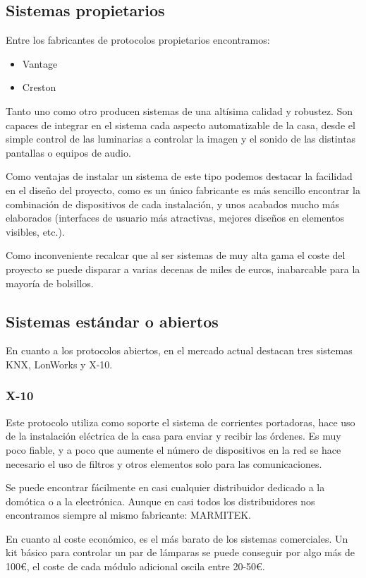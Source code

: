 \subsection{Sistemas propietarios}
Entre los fabricantes de protocolos propietarios encontramos:
\begin{itemize}
	\item Vantage
	\item Creston
\end{itemize}
Tanto uno como otro producen sistemas de una altísima calidad y robustez. Son capaces de integrar en el sistema cada aspecto automatizable de la casa, desde el simple control de las luminarias a controlar la imagen y el sonido de las distintas pantallas o equipos de audio.


Como ventajas de instalar un sistema de este tipo podemos destacar la facilidad en el diseño del proyecto, como es un único fabricante es m\'as sencillo encontrar la combinación de dispositivos de cada instalación, y unos acabados mucho m\'as elaborados (interfaces de usuario m\'as atractivas, mejores diseños en elementos visibles, etc.).


Como inconveniente recalcar que al ser sistemas de muy alta gama el coste del proyecto se puede disparar a varias decenas de miles de euros, inabarcable para la mayoría de bolsillos.

\subsection{Sistemas est\'andar o abiertos}
En cuanto a los protocolos abiertos, en el mercado actual destacan tres sistemas KNX, LonWorks y X-10.
\subsubsection{X-10}
Este protocolo utiliza como soporte el sistema de corrientes portadoras, hace uso de la instalación eléctrica de la casa para enviar y recibir las órdenes. Es muy poco fiable, y a poco que aumente el número de dispositivos en la red se hace necesario el uso de filtros y otros elementos solo para las comunicaciones.


Se puede encontrar f\'acilmente en casi cualquier distribuidor dedicado a la domótica o a la electrónica. Aunque en casi todos los distribuidores nos encontramos siempre al mismo fabricante: MARMITEK.


En cuanto al coste económico, es el m\'as barato de los sistemas comerciales. Un kit b\'asico para controlar un par de l\'amparas se puede conseguir por algo m\'as de 100\euro, el coste de cada módulo adicional oscila entre 20-50\euro.

